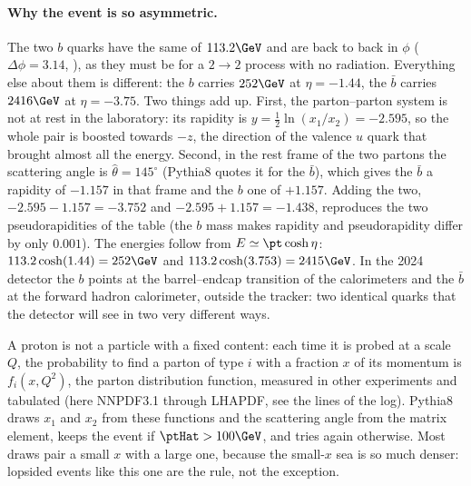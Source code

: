 \paragraph{Why the event is so asymmetric.} The two $b$ quarks have the same \pt{} of $113.2\GeV$ and
are back to back in $\phi$ ($\Delta\phi = 3.14$, ), as they must be for a
$2\to2$ process with no radiation. Everything else about them is different: the $b$ carries $252\GeV$
at $\eta = -1.44$, the $\bar b$ carries $2416\GeV$ at $\eta = -3.75$. Two things add up. First, the
parton--parton system is not at rest in the laboratory: its rapidity is
$y = \tfrac12\ln(x_1/x_2) = -2.595$, so the whole \bbbar{} pair is boosted towards $-z$, the direction of
the valence $u$ quark that brought almost all the energy. Second, in the rest frame of the two partons the
scattering angle is $\hat\theta = 145^\circ$ (Pythia8 quotes it for the $\bar b$), which gives the $\bar b$
a rapidity of $-1.157$ in that frame and the $b$ one of $+1.157$. Adding the two,
$-2.595 - 1.157 = -3.752$ and $-2.595 + 1.157 = -1.438$, reproduces the two pseudorapidities of the table (the
$b$ mass makes rapidity and pseudorapidity differ by only $0.001$). The energies follow from $E \simeq \pt\cosh\eta$:
$113.2\cosh(1.44) = 252\GeV$ and $113.2\cosh(3.753) = 2415\GeV$. In the 2024 detector the $b$ points at the barrel--endcap transition of the calorimeters and the
$\bar b$ at the forward hadron calorimeter, outside the tracker: two identical quarks that the detector
will see in two very different ways.

\begin{plainwords}
A proton is not a particle with a fixed content: each time it is probed at a scale $Q$, the probability
to find a parton of type $i$ with a fraction $x$ of its momentum is $f_i(x, Q^2)$, the parton distribution
function, measured in other experiments and tabulated (here NNPDF3.1 through LHAPDF, see the
 lines of the log). Pythia8 draws $x_1$ and $x_2$ from these functions and the
scattering angle from the matrix element, keeps the event if $\ptHat > 100\GeV$, and tries again
otherwise. Most draws pair a small $x$ with a large one, because the small-$x$ sea is so much denser:
lopsided events like this one are the rule, not the exception.
\end{plainwords}

